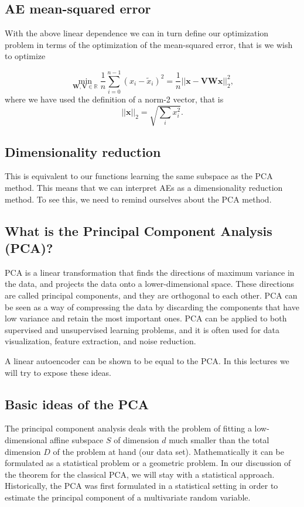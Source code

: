 \documentclass[%
oneside,                 %
final,                   %
10pt]{article}
\begin{document}
\subsection{AE mean-squared error}

With the above linear dependence we can in turn define our
optimization problem in terms of the optimization of the mean-squared
error, that is we wish to optimize

\[
\min_{\bm{W},\bm{V}\in {\mathbb{R}}}\frac{1}{n}\sum_{i=0}^{n-1}\left(x_i-\tilde{x}_i\right)^2=\frac{1}{n}\vert\vert \bm{x}-\bm{V}\bm{W}\bm{x}\vert\vert_2^2,
\]
where we have used the definition of  a norm-2 vector, that is
\[
\vert\vert \bm{x}\vert\vert_2 = \sqrt{\sum_i x_i^2}. 
\]

\subsection{Dimensionality reduction}

This is equivalent to our functions learning the same subspace as
the PCA method. This means that we can interpret AEs as a
dimensionality reduction method.  To see this, we need to remind
ourselves about the PCA method.

\subsection{What is the Principal Component Analysis (PCA)?}

PCA is a linear transformation that finds the directions of maximum
variance in the data, and projects the data onto a lower-dimensional
space. These directions are called principal components, and they are
orthogonal to each other. PCA can be seen as a way of compressing the
data by discarding the components that have low variance and retain
the most important ones. PCA can be applied to both supervised and
unsupervised learning problems, and it is often used for data
visualization, feature extraction, and noise reduction.

A linear autoencoder can be shown to be equal to the PCA.
In this lectures we will try to expose these ideas.

\subsection{Basic ideas of the PCA}

The principal component analysis deals with the problem of fitting a
low-dimensional affine subspace $S$ of dimension $d$ much smaller than
the total dimension $D$ of the problem at hand (our data
set). Mathematically it can be formulated as a statistical problem or
a geometric problem.  In our discussion of the theorem for the
classical PCA, we will stay with a statistical approach. 
Historically, the PCA was first formulated in a statistical setting in order to estimate the principal component of a multivariate random variable.
\end{document}
